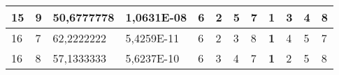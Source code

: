 \documentclass[conference]{IEEEtran}
\begin{document}
\begin{table*}[]
\begin{tabular}{|llll|llllllll|}
\multicolumn{1}{|l|}{15}                                                    & \multicolumn{1}{l|}{9}                                                        & \multicolumn{1}{l|}{50,6777778}                                                   & 1,0631E-08                     & \multicolumn{1}{l|}{6}                                                  & \multicolumn{1}{l|}{2}                                                  & \multicolumn{1}{l|}{5}                                                  & \multicolumn{1}{l|}{7}                                                  & \multicolumn{1}{l|}{\textbf{1}}                                         & \multicolumn{1}{l|}{3}                                                  & \multicolumn{1}{l|}{4}                                                  & 8                          \\ \hline
\multicolumn{1}{|l|}{16}                                                    & \multicolumn{1}{l|}{7}                                                        & \multicolumn{1}{l|}{62,2222222}                                                   & 5,4259E-11                     & \multicolumn{1}{l|}{6}                                                  & \multicolumn{1}{l|}{2}                                                  & \multicolumn{1}{l|}{3}                                                  & \multicolumn{1}{l|}{8}                                                  & \multicolumn{1}{l|}{\textbf{1}}                                         & \multicolumn{1}{l|}{4}                                                  & \multicolumn{1}{l|}{5}                                                  & 7                          \\ \hline
\multicolumn{1}{|l|}{16}                                                    & \multicolumn{1}{l|}{8}                                                        & \multicolumn{1}{l|}{57,1333333}                                                   & 5,6237E-10                     & \multicolumn{1}{l|}{6}                                                  & \multicolumn{1}{l|}{3}                                                  & \multicolumn{1}{l|}{4}                                                  & \multicolumn{1}{l|}{7}                                                  & \multicolumn{1}{l|}{\textbf{1}}                                         & \multicolumn{1}{l|}{2}                                                  & \multicolumn{1}{l|}{5}                                                  & 8                          \\ \hline

\end{tabular}
\end{table*}
\end{document}
